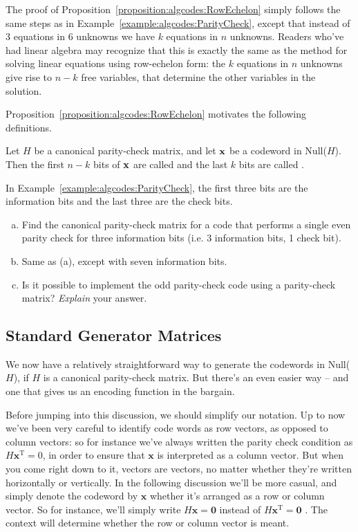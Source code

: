 The proof of Proposition~\ref{proposition:algcodes:RowEchelon} simply follows the same steps as in Example~\ref{example:algcodes:ParityCheck}, except that instead of 3 equations in 6 unknowns we have $k$ equations in $n$ unknowns. Readers who've had linear algebra may recognize that this is exactly the same as the method for solving linear equations using row-echelon form: the $k$ equations in $n$ unknowns give rise to $n-k$ free variables, that determine the other variables in the solution.

 Proposition~\ref{proposition:algcodes:RowEchelon} motivates the following definitions.
 
 \begin{defn}
 Let $H$ be a canonical parity-check matrix, and let ${\bold x}$ be a codeword in Null($H$). Then the first $n-k$ bits of ${\bold x}$ are called   and the last $k$ bits are called .
\end{defn}
In Example~\ref{example:algcodes:ParityCheck}, the first three bits are the information bits
and the last three are the check bits.
 
\begin{exercise}{}
\begin{enumerate}[(a)]
\item
Find the canonical parity-check matrix for a code that performs a single even parity check for  three information bits (i.e. 3 information bits, 1 check bit).
\item
Same as (a), except with seven information bits.
\item
Is it possible to implement the odd parity-check code using a parity-check matrix?  \emph{Explain} your answer.
\end{enumerate}
\end{exercise}

 
 \subsection{Standard Generator Matrices}
 
We now have a relatively straightforward way to generate the codewords in Null($H$), if $H$ is a canonical parity-check matrix. But there's an even easier way -- and one that gives us an encoding function in the bargain. 

Before jumping into this discussion, we should simplify our notation. Up to now we've been very careful to identify code words as row vectors, as opposed to column vectors: so for instance we've always written the parity check condition as $H \textbf{x}^\textrm{T} = 0$, in order to ensure that $\textbf{x}$ is interpreted as a column vector.  But when you come right down to it, vectors are vectors, no matter whether they're written horizontally or vertically. In the following discussion we'll be  more casual, and simply denote the codeword by $\textbf{x}$ whether it's arranged as a row or column vector. So for instance, we'll simply write $H \textbf{x} = \textbf{0}$ instead of  $H \textbf{x}^\textrm{T} = \textbf{0}$ . The context will determine whether the row or column vector is meant.

